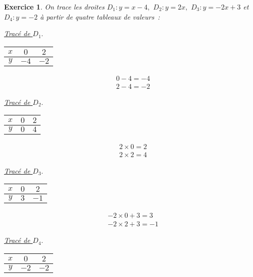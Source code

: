 \documentclass[10pt]{article}
\newtheorem{exo}{Exercice}
\begin{document}
\begin{exo}

On trace les droites  $D_1:y=x-4,$ $D_2:y=2x,$ $D_3:y=-2x+3$ et $D_4:y=-2$ à partir de quatre tableaux de valeurs~:

\setlength{\columnseprule}{1pt}

\begin{multicols}{4}
\underline{Tracé de $D_1.$}
\begin{center}
\begin{tabular}{|c|c|c|}\hline
$x$&$0$&$2$\\ \hline
$y$&$-4$&$-2$\\ \hline
\end{tabular}
\end{center}

\begin{align*}
&0-4=-4\\
&2-4=-2\end{align*}

\columnbreak

\underline{Tracé de $D_2.$}
\begin{center}
\begin{tabular}{|c|c|c|}\hline
$x$&$0$&$2$\\ \hline
$y$&$0$&$4$\\ \hline
\end{tabular}
\end{center}

\begin{align*}
&2\times 0=2\\
&2\times 2=4\end{align*}

\columnbreak

\underline{Tracé de $D_3.$}
\begin{center}
\begin{tabular}{|c|c|c|}\hline
$x$&$0$&$2$\\ \hline
$y$&$3$&$-1$\\ \hline
\end{tabular}
\end{center}

\begin{align*}
&-2\times 0+3=3\\
&-2\times 2+3=-1\end{align*}

\columnbreak

\underline{Tracé de $D_4.$}
\begin{center}
\begin{tabular}{|c|c|c|}\hline
$x$&$0$&$2$\\ \hline
$y$&$-2$&$-2$\\ \hline
\end{tabular}
\end{center}


\end{multicols}
\end{exo}
\end{document}
